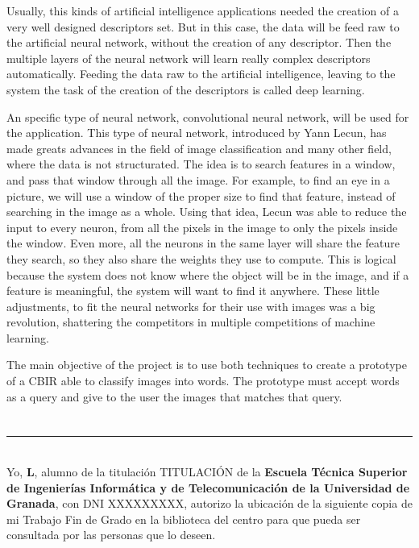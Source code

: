 Usually, this kinds of artificial intelligence applications needed the creation of a very well designed descriptors set. But in this case, the data will be feed raw to the artificial neural network, without the creation of any descriptor. Then the multiple layers of the neural network will learn really complex descriptors automatically.  Feeding the data raw to the artificial intelligence, leaving to the system the task of the creation of the descriptors is called deep learning.

An specific type of neural network, convolutional neural network, will be used for the application. This type of neural network, introduced by Yann Lecun, has made greats advances in the field of image classification and many other field, where the data is not structurated. The idea is to search features in a window, and pass that window through all the image. For example, to find an eye in a picture, we will use a window of the proper size to find that feature, instead of searching in the image as a whole. Using that idea, Lecun was able to reduce the input to every neuron, from all the pixels in the image to only the pixels inside the window. Even more, all the neurons in the same layer will share the feature they search, so they also share the weights they use to compute. This is logical because the system does not know where the object will be in the image, and if a feature is meaningful, the system will want to find it anywhere. These little adjustments, to fit the neural networks for their use with images was a big revolution, shattering the competitors in multiple competitions of machine learning.

The main objective of the project is to use both techniques to create a prototype of a CBIR able to classify images into words. The prototype must accept words as a query and give to the user the images that matches that query.\\

\chapter*{}
\thispagestyle{empty}

\noindent\rule[-1ex]{\textwidth}{2pt}\\[4.5ex]

Yo, \textbf{L}, alumno de la titulación TITULACIÓN de la \textbf{Escuela Técnica Superior
de Ingenierías Informática y de Telecomunicación de la Universidad de Granada}, con DNI XXXXXXXXX, autorizo la
ubicación de la siguiente copia de mi Trabajo Fin de Grado en la biblioteca del centro para que pueda ser
consultada por las personas que lo deseen.


